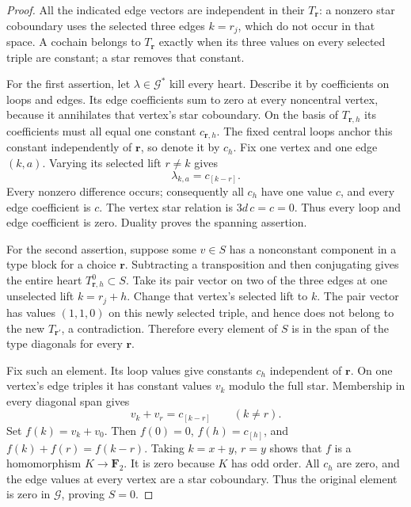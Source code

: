 \begin{proof}
All the indicated edge vectors are independent in their
$T_{\mathbf r}$: a nonzero star coboundary uses the selected
three edges $k=r_j$, which do not occur in that space.
A cochain belongs to $T_{\mathbf r}$ exactly when its three
values on every selected triple are constant; a star removes
that constant.

For the first assertion, let $\lambda\in\mathcal G^*$ kill every
heart. Describe it by coefficients on loops and edges. Its
edge coefficients sum to zero at every noncentral vertex,
because it annihilates that vertex's star coboundary.
On the basis of $T_{\mathbf r,h}$ its coefficients must all
equal one constant $c_{\mathbf r,h}$. The fixed central loops
anchor this constant independently of $\mathbf r$, so denote
it by $c_h$. Fix one vertex and one edge $(k,a)$. Varying its
selected lift $r\ne k$ gives
\[
                    \lambda_{k,a}=c_{[k-r]}.
\]
Every nonzero difference occurs; consequently all $c_h$ have
one value $c$, and every edge coefficient is $c$. The vertex
star relation is $3d\,c=c=0$. Thus every loop and edge
coefficient is zero. Duality proves the spanning assertion.

For the second assertion, suppose some $v\in S$ has a
nonconstant component in a type block for a choice $\mathbf r$.
Subtracting a transposition and then conjugating gives the
entire heart $T_{\mathbf r,h}^0\subset S$. Take its pair vector
on two of the three edges at one unselected lift $k=r_j+h$.
Change that vertex's selected lift to $k$. The pair vector
has values $(1,1,0)$ on this newly selected triple, and hence
does not belong to the new $T_{\mathbf r'}$, a contradiction.
Therefore every element of $S$ is in the span of the type
diagonals for every $\mathbf r$.

Fix such an element. Its loop values give constants $c_h$
independent of $\mathbf r$. On one vertex's edge triples it
has constant values $v_k$ modulo the full star. Membership
in every diagonal span gives
\[
                   v_k+v_r=c_{[k-r]}\qquad(k\ne r).
\]
Set $f(k)=v_k+v_0$. Then $f(0)=0$, $f(h)=c_{[h]}$, and
$f(k)+f(r)=f(k-r)$. Taking $k=x+y$, $r=y$ shows that $f$
is a homomorphism $K\to\mathbf F_2$. It is zero because $K$
has odd order. All $c_h$ are zero, and the edge values at
every vertex are a star coboundary. Thus the original element
is zero in $\mathcal G$, proving $S=0$.
\end{proof}

